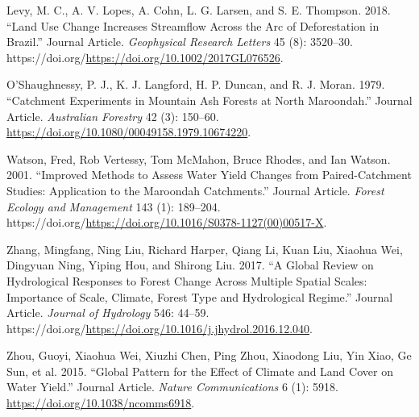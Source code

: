 \documentclass[]{elsarticle} %
\newlength{\cslhangindent}
\newlength{\cslentryspacingunit} %
\newenvironment{CSLReferences}[2] %
 {%
  \setlength{\parindent}{0pt}
  \ifodd #1
  \let\oldpar\par
  \def\par{\hangindent=\cslhangindent\oldpar}
  \fi
  \setlength{\parskip}{#2\cslentryspacingunit}
 }%
 {}
\begin{document}
\begin{CSLReferences}{1}{0}
\leavevmode{}%
Levy, M. C., A. V. Lopes, A. Cohn, L. G. Larsen, and S. E. Thompson. 2018. {``Land Use Change Increases Streamflow Across the Arc of Deforestation in Brazil.''} Journal Article. \emph{Geophysical Research Letters} 45 (8): 3520--30. https://doi.org/\url{https://doi.org/10.1002/2017GL076526}.

\leavevmode{}%
O'Shaughnessy, P. J., K. J. Langford, H. P. Duncan, and R. J. Moran. 1979. {``Catchment Experiments in Mountain Ash Forests at North Maroondah.''} Journal Article. \emph{Australian Forestry} 42 (3): 150--60. \url{https://doi.org/10.1080/00049158.1979.10674220}.

\leavevmode{}%
Watson, Fred, Rob Vertessy, Tom McMahon, Bruce Rhodes, and Ian Watson. 2001. {``Improved Methods to Assess Water Yield Changes from Paired-Catchment Studies: Application to the Maroondah Catchments.''} Journal Article. \emph{Forest Ecology and Management} 143 (1): 189--204. https://doi.org/\url{https://doi.org/10.1016/S0378-1127(00)00517-X}.

\leavevmode{}%
Zhang, Mingfang, Ning Liu, Richard Harper, Qiang Li, Kuan Liu, Xiaohua Wei, Dingyuan Ning, Yiping Hou, and Shirong Liu. 2017. {``A Global Review on Hydrological Responses to Forest Change Across Multiple Spatial Scales: Importance of Scale, Climate, Forest Type and Hydrological Regime.''} Journal Article. \emph{Journal of Hydrology} 546: 44--59. https://doi.org/\url{https://doi.org/10.1016/j.jhydrol.2016.12.040}.

\leavevmode{}%
Zhou, Guoyi, Xiaohua Wei, Xiuzhi Chen, Ping Zhou, Xiaodong Liu, Yin Xiao, Ge Sun, et al. 2015. {``Global Pattern for the Effect of Climate and Land Cover on Water Yield.''} Journal Article. \emph{Nature Communications} 6 (1): 5918. \url{https://doi.org/10.1038/ncomms6918}.

\end{CSLReferences}
\end{document}
